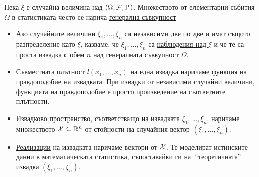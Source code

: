 \documentclass[numbers=endperiod, DIV=15, bibliography=totocnumbered]{scrartcl}
\begin{document}
\begin{definition}[Извадки]
  Нека $\xi$ е случайна величина над $(\Omega, \mathcal{F}, \operatorname{P})$. Множеството от елементарни събития $\Omega$ в статистиката често се нарича \uline{генерална съвкупност}

  \begin{itemize}
    \item Ако случайните величини $\xi_1, \ldots, \xi_n$ са независими две по две и имат същото разпределение като $\xi$, казваме, че $\xi_1, \ldots, \xi_n$ са \uline{наблюдения над $\xi$} и че те са \uline{проста извадка с обем $n$} над генералната съвкупност $\Omega$.
    \item Съвместната плътност $l(x_1, \ldots, x_n)$ на една извадка наричаме \uline{функция на правдоподобие на извадката}. При извадки от независими случайни величини, функцията на правдоподобие е просто произведение на съответните плътности.
    \item \uline{Извадково} пространство, съответстващо на извадката $\xi_1, \ldots, \xi_n$, наричаме множеството $\mathcal{X} \subseteq \mathbb{R}^n$ от стойности на случайния вектор $(\xi_1, \ldots, \xi_n)$.
    \item \uline{Реализации} на извадката наричаме вектори от $\mathcal{X}$. Те моделират истинските данни в математическата статистика, съпоставяйки ги на~\enquote{теоретичната} извадка $(\xi_1, \ldots, \xi_n)$.
  \end{itemize}
\end{definition}
\end{document}
